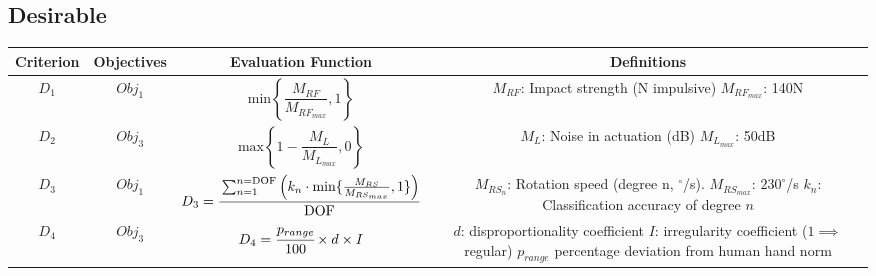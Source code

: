 \documentclass[11pt,3p]{report}
\begin{document}
	\subsection{Desirable} \label{des}
		\begin{center}
			\begin{tabular}{ |c|c|c|c| } 
 \hline
 Criterion & Objectives & Evaluation Function & Definitions \\ 
 \hline\hline
 $D_1$ & $Obj_1$ & $\text{min} \left \{\dfrac{M_{RF}}{M_{RF_{max}}},1 \right \}$ &  \makecell[l]{
  \vspace{1mm}
 $M_{RF}$: Impact strength (N impulsive) \\
 $M_{RF_{max}}$: 140N
 \vspace{1mm}
 } \\
 \hline
 
 $D_2$ & $Obj_3$ & $\text{max} \left \{1-\dfrac{M_L}{M_{L_{max}}}, 0 \right \}$ &  \makecell[l]{
 \vspace{2mm}
 $M_L$: Noise in actuation (dB) \\
 $M_{L_{max}}$: 50dB
 } \\
 \hline

 $D_3$ & $Obj_1$ & $D_3 =  \cfrac{\sum_{n=1}^{n=\text{DOF}} \left(k_n \cdot \text{min}\{\frac{M_{RS}}{M_{RS_{max}}},1\} \right)}{\text{DOF}}$ &  \makecell[l]{
 $M_{RS_n}$: Rotation speed (degree n, $^\circ$/s). \\
 $M_{RS_{max}}$: $230^\circ$/s \\
 $k_n$: Classification accuracy of degree $n$
 } \\
 \hline
 $D_4$ & $Obj_3$ & $D_4 = \cfrac{p_{range}}{100} \times d  \times I $ &  \makecell[l]{
$d$: disproportionality coefficient \\
 $I$: irregularity coefficient ($1 \implies$ regular) \\
 $p_{range}$ percentage deviation from \\
 human hand norm
 } \\
 
 \hline
		\end{tabular}
	\end{center}



\pagebreak
\end{document}
